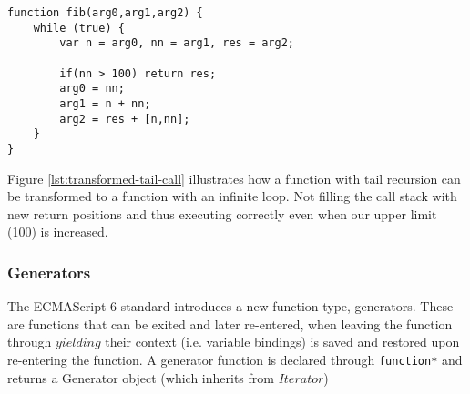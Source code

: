 \begin{lstlisting}[caption={Semantically identical function, without tail recursion},label={lst:transformed-tail-call}]
function fib(arg0,arg1,arg2) {
	while (true) {
		var n = arg0, nn = arg1, res = arg2;

		if(nn > 100) return res;
		arg0 = nn;
		arg1 = n + nn;
		arg2 = res + [n,nn];
	}
}
\end{lstlisting}

Figure \ref{lst:transformed-tail-call} illustrates how a function with tail recursion can be transformed to a function with an infinite loop. Not filling the call stack with new return positions and thus executing correctly even when our upper limit (100) is increased.

\subsubsection{Generators}
The ECMAScript 6 standard introduces a new function type, generators\cite[14.4]{SpecJS}. These are functions that can be exited and later re-entered, when leaving the function through $yielding$ their context (i.e. variable bindings) is saved and restored upon re-entering the function. A generator function is declared through \lstinline$function*$ and returns a Generator object (which inherits from $Iterator$)

